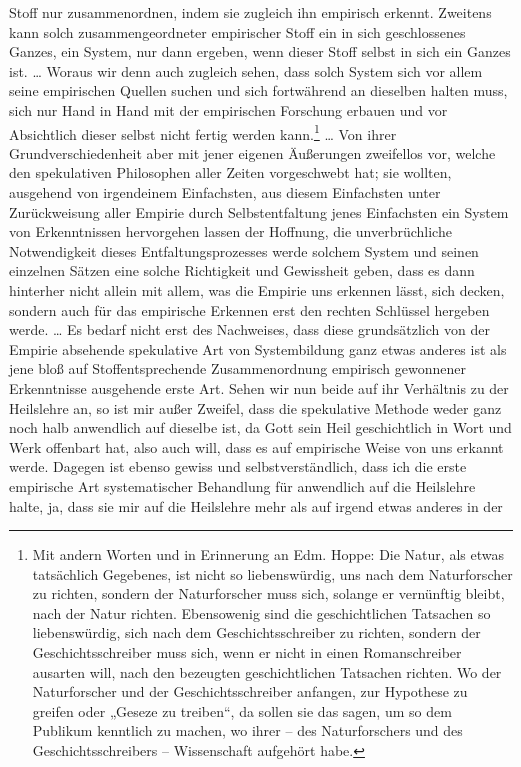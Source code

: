 \thispagestyle{plain}\setcounter{page}{166}Stoff nur zusammenordnen, indem sie zugleich ihn empirisch erkennt. Zweitens kann solch zusammengeordneter empirischer Stoff ein in sich geschlossenes Ganzes, ein System, nur dann ergeben, wenn dieser Stoff selbst in sich ein Ganzes ist. \dots{} Woraus wir denn auch zugleich sehen, dass solch System sich vor allem seine empirischen Quellen suchen und sich fortwährend an dieselben halten muss, sich nur Hand in Hand mit der empirischen Forschung erbauen und vor Absichtlich dieser selbst nicht fertig werden kann.\setcounter{footnote}{561}\footnote{Mit andern Worten und in Erinnerung an Edm. Hoppe: Die Natur, als etwas tatsächlich Gegebenes, ist nicht so liebenswürdig, uns nach dem Naturforscher zu richten, sondern der Naturforscher muss sich, solange er vernünftig bleibt, nach der Natur richten. Ebensowenig sind die geschichtlichen Tatsachen so liebenswürdig, sich nach dem Geschichtsschreiber zu richten, sondern der Geschichtsschreiber muss sich, wenn er nicht in einen Romanschreiber ausarten will, nach den bezeugten geschichtlichen Tatsachen richten. Wo der Naturforscher und der Geschichtsschreiber anfangen, zur Hypothese zu greifen oder „Geseze zu treiben“, da sollen sie das sagen, um so dem Publikum kenntlich zu machen, wo ihrer -- des Naturforschers und des Geschichtsschreibers -- Wissenschaft aufgehört habe.} \dots{} Von ihrer Grundverschiedenheit aber mit jener eigenen Äußerungen zweifellos vor, welche den spekulativen Philosophen aller Zeiten vorgeschwebt hat; sie wollten, ausgehend von irgendeinem Einfachsten, aus diesem Einfachsten unter Zurückweisung aller Empirie durch Selbstentfaltung jenes Einfachsten ein System von Erkenntnissen hervorgehen lassen der Hoffnung, die unverbrüchliche Notwendigkeit dieses Entfaltungsprozesses werde solchem System und seinen einzelnen Sätzen eine solche Richtigkeit und Gewissheit geben, dass es dann hinterher nicht allein mit allem, was die Empirie uns erkennen lässt, sich decken, sondern auch für das empirische Erkennen erst den rechten Schlüssel hergeben werde. \dots{} Es bedarf nicht erst des Nachweises, dass diese grundsätzlich von der Empirie absehende spekulative Art von Systembildung ganz etwas anderes ist als jene bloß auf Stoffentsprechende Zusammenordnung empirisch gewonnener Erkenntnisse ausgehende erste Art. Sehen wir nun beide auf ihr Verhältnis zu der Heilslehre an, so ist mir außer Zweifel, dass die spekulative Methode weder ganz noch halb anwendlich auf dieselbe ist, da Gott sein Heil geschichtlich in Wort und Werk offenbart hat, also auch will, dass es auf empirische Weise von uns erkannt werde. Dagegen ist ebenso gewiss und selbstverständlich, dass ich die erste empirische Art systematischer Behandlung für anwendlich auf die Heilslehre halte, ja, dass sie mir auf die Heilslehre mehr als auf irgend etwas anderes in der